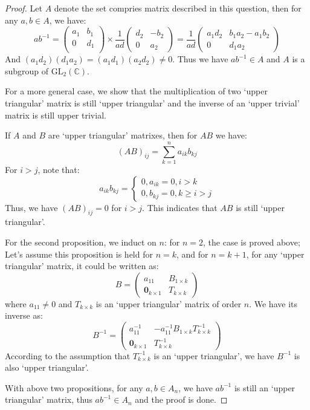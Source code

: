 \documentclass[a4paper, pdf, 12pt]{article}
\begin{document}
  \begin{proof}
    Let $A$ denote the set compries matrix described in this question, then for any $a,b\in A$, we have:
    $$
    ab^{-1} = \begin{pmatrix}
      a_{1} & b_{1}\\
      0 & d_{1}\\
    \end{pmatrix}
    \times
    \frac{1}{ad}
    \begin{pmatrix}
      d_{2} & -b_{2}\\
      0 & a_{2}
    \end{pmatrix}
    =\frac{1}{ad} \begin{pmatrix}
      a_1d_2 & b_1a_2 - a_1b_2 \\
      0 & d_1a_2
    \end{pmatrix}
    $$
    And $(a_1d_2)(d_1a_2) = (a_1d_1)(a_2d_2)\neq 0$. Thus we have $ab^{-1}\in A$ and $A$ is 
    a subgroup of $\mbox{GL}_{2}(\mathbb{C})$.

    For a more general case, we show that the multiplication of two `upper triangular' matrix is still 
    `upper triangular' and the inverse of an `upper trivial' matrix is still upper trivial.

    If $A$ and $B$ are `upper triangular' matrixes, then for $AB$ we have:
    $$
    (AB)_{ij} = \sum_{k = 1}^{n}a_{ik}b_{kj}
    $$ 
    For $i > j$, note that:
    $$
      a_{ik}b_{kj} = 
    \begin{cases}
      0, a_{ik} = 0, i > k  \\
      0, b_{kj} = 0, k \geq i > j
    \end{cases}
    $$
    Thus, we have $(AB)_{ij} = 0$ for $i > j$. This indicates that $AB$ is still `upper triangular'.

    For the second proposition, we induct on $n$: for $n=2$, the case is proved above; Let's assume this proposition is held
    for $n=k$, and for $n=k+1$, for any `upper triangular' matrix, it could be written as:
    $$
    B = 
    \begin{pmatrix}
      a_{11} & B_{1\times k}\\
      \mathbf{0}_{k\times 1} & T_{k\times k}
    \end{pmatrix}
    $$ where $a_{11}\neq 0$ and $T_{k\times k}$ is an `upper triangular' matrix of order $n$.
    We have its inverse as:
    $$
    B^{-1} = 
    \begin{pmatrix}
      a_{11}^{-1} & -a_{11}^{-1}B_{1\times k}T_{k\times k}^{-1} \\
      \mathbf{0}_{k\times 1} & T_{k\times k}^{-1}
    \end{pmatrix}
    $$
    According to the assumption that $T_{k\times k}^{-1}$ is an `upper triangular', we have $B^{-1}$ is also `upper triangular'.

    With above two propositions, for any $a,b\in A_{n}$, we have $ab^{-1}$ is still an `upper triangular' matrix, thus $ab^{-1}\in A_{n}$ and the 
    proof is done.
  \end{proof}
\end{document}
